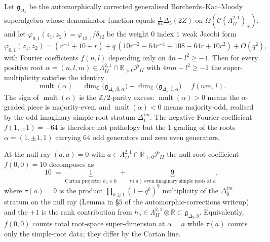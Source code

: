 \begin{lemma}
\label{lem:phi01-super-character-gDelta5}
Let $\mathfrak g_{\Delta_5}$ be the automorphically corrected
generalised Borcherds--Kac--Moody superalgebra whose denominator
function equals $\tfrac{1}{64}\Delta_5(2Z)$ on
$\Omega(\mathcal C(\Lambda^{2,1}_{II})_+)$, and let
$\varphi_{0,1}(z_1,z_2) = \varphi_{12,1}/\delta_{12}$ be the weight
$0$ index $1$ weak Jacobi form
\[
 \varphi_{0,1}(z_1,z_2)
 = (r^{-1}+10+r) + q\,(10 r^{-2} - 64 r^{-1} + 108 - 64 r + 10 r^{2})
 + O(q^{2}),
\]
with Fourier coefficients $f(n,l)$ depending only on
$4n-l^{2}\ge -1$. Then for every positive root
$\alpha = (n,l,m)\in\Lambda^{2,1}_{II}\cap\mathbb R_{>0}\mathcal P_{II}$
with $4nm-l^{2}\ge -1$ the super-multiplicity satisfies the identity
\begin{equation}
\label{eq:mult-super-dim-phi01}
 \operatorname{mult}(\alpha)
 = \dim_{\mathbb C}\bigl(\mathfrak g_{\Delta_5,\overline 0,\alpha}\bigr)
 - \dim_{\mathbb C}\bigl(\mathfrak g_{\Delta_5,\overline 1,\alpha}\bigr)
 = f(nm,\,l).
\end{equation}
The sign of $\operatorname{mult}(\alpha)$ is the
$\mathbb Z/2$-parity excess: $\operatorname{mult}(\alpha)>0$ means the
$\alpha$-graded piece is majority-even, and
$\operatorname{mult}(\alpha)<0$ means majority-odd, realised by the
odd imaginary simple-root stratum $\Delta^{im}_{\overline 1}$. The
negative Fourier coefficient $f(1,\pm 1) = -64$ is therefore not
pathology but the $\overline 1$-grading of the roots
$\alpha=(1,\pm 1,1)$ carrying $64$ odd generators and zero even
generators.

At the null ray $(a,a)=0$ with $a\in\Lambda^{2,1}_{II}\cap\mathbb
R_{>0}\mathcal P_{II}$ the null-root coefficient $f(0,0)=10$
decomposes as
\begin{equation}
\label{eq:null-ray-10-9-plus-1}
 10 \;=\; \underbrace{1}_{\text{Cartan projector } h_a\in\mathfrak h}
 \;+\; \underbrace{9}_{\tau(a)\text{ even imaginary simple roots at } a},
\end{equation}
where $\tau(a)=9$ is the product $\prod_{k\ge 1}(1-q^{k})^{9}$
multiplicity of the $\Delta^{im}_{\overline 0}$ stratum on the
null ray (Lemma in \S$5$ of the automorphic-corrections writeup) and
the $+1$ is the rank contribution from
$h_{a}\in\Lambda^{2,1}_{II}\otimes\mathbb R\subset\mathfrak
g_{\Delta_5,0}$. Equivalently, $f(0,0)$ counts total root-space
super-dimension at $\alpha=a$ while $\tau(a)$ counts only the
simple-root data; they differ by the Cartan line.
\end{lemma}

